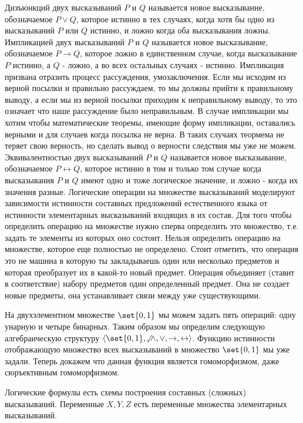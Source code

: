Дизъюнкций двух высказываний $P$ и $Q$ называется новое высказывание,
обозначаемое $P\vee Q$, которое истинно в тех случаях, когда хотя бы одно из
высказываний $P$ или $Q$ истинно, и ложно когда оба высказывания ложны.
Импликацией двух высказываний $P$ и $Q$ называется новое высказывание,
обозначаемое $P \rightarrow Q$, которое ложно в единственном случае, когда
высказывание $P$ истинно, а $Q$ - ложно, а во всех остальных случаях - истинно.
Импликация призвана отразить процесс рассуждения, умозаключения. Если мы исходим
из верной посылки и правильно рассуждаем, то мы должны прийти к правильному
выводу, а если мы из верной посылки приходим к неправильному выводу, то это
означает что наше рассуждение было неправильным.
В случае импликации мы хотим чтобы математические теоремы, имеющие форму
импликации, оставались верными и для случаев когда посылка не верна. В таких
случаях теормема не теряет свою верность, но сделать вывод о верности следствия
мы уже не можем.
Эквивалентностью двух высказываний $P$ и $Q$ называется новое высказывание,
обозначаемое $P \leftrightarrow Q$, которое истинно в том и только том случае
когда высказывания $P$ и $Q$ имеют одно и тоже логическое значение, и ложно -
когда их значения разные.
Логические операции на множестве высказываний моделируют зависимости истинности
составных предложений естественного языка от истинности элементарных
высказываний входящих в их состав.
Для того чтобы определить операцию на множестве нужно сперва определить это
множество, т.е. задать те элементы из которых оно состоит. Нельзя определить
операцию на множестве, которое еще полностью не определено. Стоит отметить, что
операция это не машина в которую ты закладываешь один или несколько предметов и
которая преобразует их в какой-то новый предмет. Операция объединяет (ставит в
соответствие) набору предметов один определенный предмет.  Она не создает новые
предметы, она устанавливает связи между уже существующими.

На двухэлементном множестве $\set{0,1}$ мы можем задать пять операций: одну
унарную и четыре бинарных. Таким образом мы определим следующую алгебраическую
структуру $\left<\set{0,1}, \not, \land, \lor, \rightarrow,
\leftrightarrow\right>$. Функцию истинности отображающую множество всех
высказываний в множество $\set{0, 1}$ мы уже задали. Теперь докажем что данная
функция является гомоморфизмом, даже сюръективным гомоморфизмом.

Логические формулы есть схемы построения составных (сложных) высказываний.
Переменные $X,Y,Z$ есть переменные множества элементарных высказываний.

